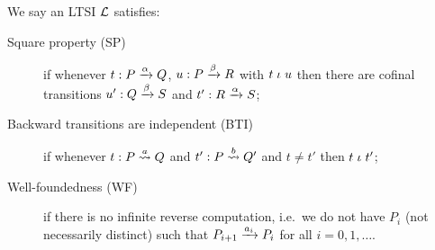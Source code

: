 \begin{definition}\label{def:basic}
  We say an LTSI $\mathcal{L}$ satisfies:
  \begin{description}
  \item[Square property (SP)] if whenever $t:P \xrightarrow[]{\alpha} Q$, $u:P
    \xrightarrow[]{\beta} R$ with $t \mathrel{\iota} u$ then there are cofinal transitions
    $u': Q \xrightarrow[]{\beta} S$ and $t':R \xrightarrow[]{\alpha} S$;%
  \item[Backward transitions are independent (BTI)] if whenever $t:P \stackrel{a}{\rightsquigarrow} Q$ and $t': P \stackrel{b}{\rightsquigarrow} Q'$ 
    and $t \neq t'$ then $t \mathrel{\iota} t'$;%
  \item[Well-foundedness (WF)] if there is no infinite reverse
    computation, i.e.\ we do not have $P_i$ (not necessarily distinct)
    such that $P_{i+1} \xrightarrow[]{a_i} P_i$ for all $i = 0,1,\ldots$.
  \end{description}
\end{definition}